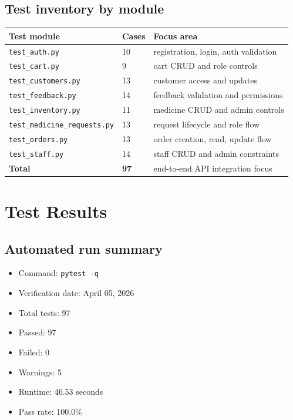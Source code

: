\documentclass[11pt,a4paper]{article}
\newcommand{\apipath}[1]{\texttt{#1}}
\begin{document}
\subsection{Test inventory by module}
\begin{longtable}{p{}p{}p{}}
\toprule
\textbf{Test module} & \textbf{Cases} & \textbf{Focus area} \\
\midrule
\apipath{test_auth.py} & 10 & registration, login, auth validation \\
\apipath{test_cart.py} & 9 & cart CRUD and role controls \\
\apipath{test_customers.py} & 13 & customer access and updates \\
\apipath{test_feedback.py} & 14 & feedback validation and permissions \\
\apipath{test_inventory.py} & 11 & medicine CRUD and admin controls \\
\apipath{test_medicine_requests.py} & 13 & request lifecycle and role flow \\
\apipath{test_orders.py} & 13 & order creation, read, update flow \\
\apipath{test_staff.py} & 14 & staff CRUD and admin constraints \\
\midrule
\textbf{Total} & \textbf{97} & end-to-end API integration focus \\
\bottomrule
\end{longtable}

\section{Test Results}
\subsection{Automated run summary}
\begin{itemize}[leftmargin=1.2cm]
  \item Command: \apipath{pytest -q}
  \item Verification date: April 05, 2026
  \item Total tests: 97
  \item Passed: 97
  \item Failed: 0
  \item Warnings: 5
  \item Runtime: 46.53 seconds
  \item Pass rate: 100.0\%
\end{itemize}
\end{document}
